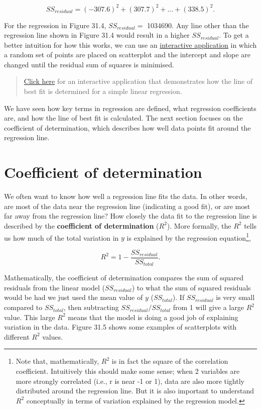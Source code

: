 \documentclass[
]{scrbook}
\begin{document}
\[SS_{residual} = (-307.6)^{2} + (307.7)^2 + ... + (338.5)^{2}.\]

For the regression in Figure 31.4, \(SS_{residual} =\) 1034690.
Any line other than the regression line shown in Figure 31.4 would result in a higher \(SS_{residual}\).
To get a better intuition for how this works, we can use an \href{https://bradduthie.shinyapps.io/regr_click/}{interactive application} in which a random set of points are placed on scatterplot and the intercept and slope are changed until the residual sum of squares is minimised.

\begin{quote}
\href{https://bradduthie.shinyapps.io/regr_click/}{Click here} for an interactive application that demonstrates how the line of best fit is determined for a simple linear regression.
\end{quote}

We have seen how key terms in regression are defined, what regression coefficients are, and how the line of best fit is calculated.
The next section focuses on the coefficient of determination, which describes how well data points fit around the regression line.

\hypertarget{coefficient-of-determination}{%
\section{Coefficient of determination}\label{coefficient-of-determination}}

We often want to know how well a regression line fits the data.
In other words, are most of the data near the regression line (indicating a good fit), or are most far away from the regression line?
How closely the data fit to the regression line is described by the \textbf{coefficient of determination} (\(R^{2}\)).
More formally, the \(R^{2}\) tells us how much of the total variation in \(y\) is explained by the regression equation\footnote{Note that, mathematically, \(R^{2}\) is in fact the square of the correlation coefficient. Intuitively this should make some sense; when 2 variables are more strongly correlated (i.e., r is near -1 or 1), data are also more tightly distributed around the regression line. But it is also important to understand \(R^{2}\) conceptually in terms of variation explained by the regression model.},

\[R^{2} = 1 - \frac{SS_{residual}}{SS_{total}}.\]

Mathematically, the coefficient of determination compares the sum of squared residuals from the linear model (\(SS_{residual}\)) to what the sum of squared residuals would be had we just used the mean value of \(y\) (\(SS_{total}\)).
If \(SS_{residual}\) is very small compared to \(SS_{total}\), then subtracting \(SS_{residual}/SS_{total}\) from 1 will give a large \(R^{2}\) value.
This large \(R^{2}\) means that the model is doing a good job of explaining variation in the data.
Figure 31.5 shows some examples of scatterplots with different \(R^{2}\) values.
\end{document}
